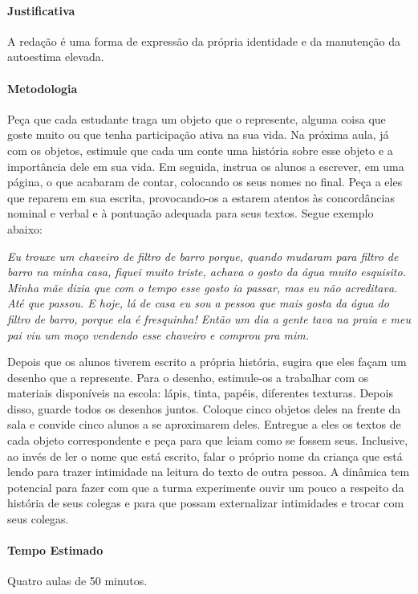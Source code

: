\documentclass[11pt]{extarticle}
\begin{document}
\paragraph{Justificativa} A redação é uma forma de expressão da própria identidade e da manutenção da autoestima elevada.  

\paragraph{Metodologia} Peça que cada estudante traga um objeto que o represente, alguma coisa que goste muito ou que tenha participação ativa na sua vida. Na próxima aula, já com os objetos, estimule que cada um conte uma história sobre esse objeto e a importância dele em sua vida. Em seguida, instrua os alunos a escrever, em uma página, o que acabaram de contar, colocando os seus nomes no final. Peça a eles que reparem em sua escrita, provocando-os a estarem atentos às concordâncias nominal e verbal e à pontuação adequada para seus textos. Segue exemplo abaixo:

\textit{Eu trouxe um chaveiro de filtro de barro porque, quando mudaram para filtro de barro na minha casa, fiquei muito triste, achava o gosto da água muito esquisito. Minha mãe dizia que com o tempo esse gosto ia passar, mas eu não acreditava. Até que passou. E hoje, lá de casa eu sou a pessoa que mais gosta da água do filtro de barro, porque ela é fresquinha! Então um dia a gente tava na praia e meu pai viu um moço vendendo esse chaveiro e comprou pra mim.}

Depois que os alunos tiverem escrito a própria história, sugira que eles façam um desenho que a represente. Para o desenho, estimule-os a trabalhar com os materiais disponíveis na escola: lápis, tinta, papéis, diferentes texturas. Depois disso, guarde todos os desenhos juntos. Coloque cinco objetos deles na frente da sala e convide cinco alunos a se aproximarem deles. Entregue a eles os textos de cada objeto correspondente e peça para que leiam como se fossem seus. Inclusive, ao invés de ler o nome que está escrito, falar o próprio nome da criança que está lendo para trazer intimidade na leitura do texto de outra pessoa. A dinâmica tem potencial para fazer com que a turma experimente ouvir um pouco a respeito da história de seus colegas e para que possam externalizar intimidades e trocar com seus colegas. 

\paragraph{Tempo Estimado} Quatro aulas de 50 minutos.
\end{document}
